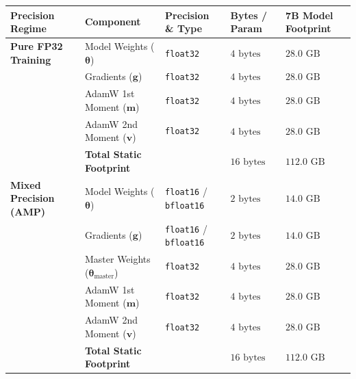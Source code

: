 \documentclass[
  letterpaper,
]{scrbook}
\newcounter{none} %
\begin{document}
{\def\LTcaptype{none} %
\begin{longtable}[]{@{}
  >{\raggedright\arraybackslash}p{}
  >{\raggedright\arraybackslash}p{}
  >{\raggedright\arraybackslash}p{}
  >{\centering\arraybackslash}p{}
  >{\centering\arraybackslash}p{}@{}}
\toprule\noalign{}
\begin{minipage}[b]{\linewidth}\raggedright
Precision Regime
\end{minipage} & \begin{minipage}[b]{\linewidth}\raggedright
Component
\end{minipage} & \begin{minipage}[b]{\linewidth}\raggedright
Precision \& Type
\end{minipage} & \begin{minipage}[b]{\linewidth}\centering
Bytes / Param
\end{minipage} & \begin{minipage}[b]{\linewidth}\centering
7B Model Footprint
\end{minipage} \\
\midrule\noalign{}
\endhead
\bottomrule\noalign{}
\endlastfoot
\textbf{Pure FP32 Training} & Model Weights (\(\mathbf{\theta}\)) &
\texttt{float32} & \(4\text{ bytes}\) & \(28.0\text{ GB}\) \\
& Gradients (\(\mathbf{g}\)) & \texttt{float32} & \(4\text{ bytes}\) &
\(28.0\text{ GB}\) \\
& AdamW 1st Moment (\(\mathbf{m}\)) & \texttt{float32} &
\(4\text{ bytes}\) & \(28.0\text{ GB}\) \\
& AdamW 2nd Moment (\(\mathbf{v}\)) & \texttt{float32} &
\(4\text{ bytes}\) & \(28.0\text{ GB}\) \\
& \textbf{Total Static Footprint} & & \textbf{\(16\text{ bytes}\)} &
\textbf{\(112.0\text{ GB}\)} \\
\textbf{Mixed Precision (AMP)} & Model Weights (\(\mathbf{\theta}\)) &
\texttt{float16} / \texttt{bfloat16} & \(2\text{ bytes}\) &
\(14.0\text{ GB}\) \\
& Gradients (\(\mathbf{g}\)) & \texttt{float16} / \texttt{bfloat16} &
\(2\text{ bytes}\) & \(14.0\text{ GB}\) \\
& Master Weights (\(\mathbf{\theta}_{\text{master}}\)) &
\texttt{float32} & \(4\text{ bytes}\) & \(28.0\text{ GB}\) \\
& AdamW 1st Moment (\(\mathbf{m}\)) & \texttt{float32} &
\(4\text{ bytes}\) & \(28.0\text{ GB}\) \\
& AdamW 2nd Moment (\(\mathbf{v}\)) & \texttt{float32} &
\(4\text{ bytes}\) & \(28.0\text{ GB}\) \\
& \textbf{Total Static Footprint} & & \textbf{\(16\text{ bytes}\)} &
\textbf{\(112.0\text{ GB}\)} \\
\end{longtable}
}
\end{document}
